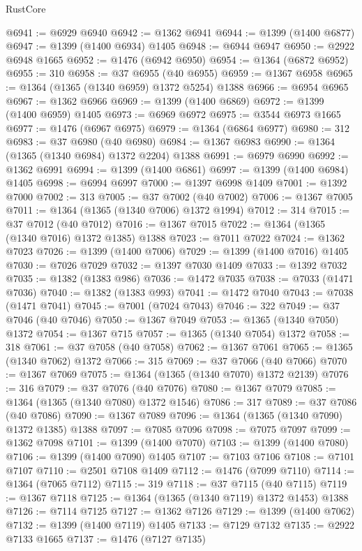 \begin{lexlean}{RustCore}
\begin{coremodule}
@6941 := @6929 @6940
@6942 := @1362 @6941
@6944 := @1399 (@1400 @6877)
@6947 := @1399 (@1400 @6934) @1405
@6948 := @6944 @6947
@6950 := @2922 @6948 @1665
@6952 := @1476 (@6942 @6950)
@6954 := @1364 (@6872 @6952)
@6955 := 310
@6958 := @37 @6955 (@40 @6955)
@6959 := @1367 @6958
@6965 := @1364 (@1365 (@1340 @6959) @1372 @5254) @1388
@6966 := @6954 @6965
@6967 := @1362 @6966
@6969 := @1399 (@1400 @6869)
@6972 := @1399 (@1400 @6959) @1405
@6973 := @6969 @6972
@6975 := @3544 @6973 @1665
@6977 := @1476 (@6967 @6975)
@6979 := @1364 (@6864 @6977)
@6980 := 312
@6983 := @37 @6980 (@40 @6980)
@6984 := @1367 @6983
@6990 := @1364 (@1365 (@1340 @6984) @1372 @2204) @1388
@6991 := @6979 @6990
@6992 := @1362 @6991
@6994 := @1399 (@1400 @6861)
@6997 := @1399 (@1400 @6984) @1405
@6998 := @6994 @6997
@7000 := @1397 @6998 @1409
@7001 := @1392 @7000
@7002 := 313
@7005 := @37 @7002 (@40 @7002)
@7006 := @1367 @7005
@7011 := @1364 (@1365 (@1340 @7006) @1372 @1994)
@7012 := 314
@7015 := @37 @7012 (@40 @7012)
@7016 := @1367 @7015
@7022 := @1364 (@1365 (@1340 @7016) @1372 @1385) @1388
@7023 := @7011 @7022
@7024 := @1362 @7023
@7026 := @1399 (@1400 @7006)
@7029 := @1399 (@1400 @7016) @1405
@7030 := @7026 @7029
@7032 := @1397 @7030 @1409
@7033 := @1392 @7032
@7035 := @1382 (@1383 @986)
@7036 := @1472 @7035
@7038 := @7033 (@1471 @7036)
@7040 := @1382 (@1383 @993)
@7041 := @1472 @7040
@7043 := @7038 (@1471 @7041)
@7045 := @7001 (@7024 @7043)
@7046 := 322
@7049 := @37 @7046 (@40 @7046)
@7050 := @1367 @7049
@7053 := @1365 (@1340 @7050) @1372
@7054 := @1367 @715
@7057 := @1365 (@1340 @7054) @1372
@7058 := 318
@7061 := @37 @7058 (@40 @7058)
@7062 := @1367 @7061
@7065 := @1365 (@1340 @7062) @1372
@7066 := 315
@7069 := @37 @7066 (@40 @7066)
@7070 := @1367 @7069
@7075 := @1364 (@1365 (@1340 @7070) @1372 @2139)
@7076 := 316
@7079 := @37 @7076 (@40 @7076)
@7080 := @1367 @7079
@7085 := @1364 (@1365 (@1340 @7080) @1372 @1546)
@7086 := 317
@7089 := @37 @7086 (@40 @7086)
@7090 := @1367 @7089
@7096 := @1364 (@1365 (@1340 @7090) @1372 @1385) @1388
@7097 := @7085 @7096
@7098 := @7075 @7097
@7099 := @1362 @7098
@7101 := @1399 (@1400 @7070)
@7103 := @1399 (@1400 @7080)
@7106 := @1399 (@1400 @7090) @1405
@7107 := @7103 @7106
@7108 := @7101 @7107
@7110 := @2501 @7108 @1409
@7112 := @1476 (@7099 @7110)
@7114 := @1364 (@7065 @7112)
@7115 := 319
@7118 := @37 @7115 (@40 @7115)
@7119 := @1367 @7118
@7125 := @1364 (@1365 (@1340 @7119) @1372 @1453) @1388
@7126 := @7114 @7125
@7127 := @1362 @7126
@7129 := @1399 (@1400 @7062)
@7132 := @1399 (@1400 @7119) @1405
@7133 := @7129 @7132
@7135 := @2922 @7133 @1665
@7137 := @1476 (@7127 @7135)

\end{coremodule}
\end{lexlean}
